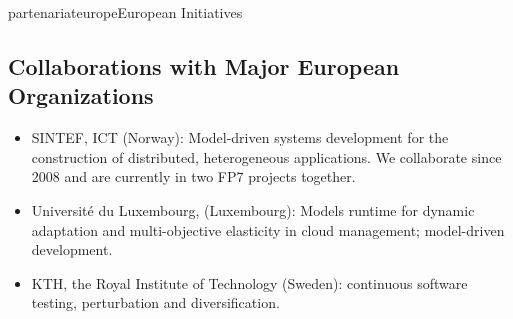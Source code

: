 \documentclass{ra2018}
\begin{document}
\begin{module}{partenariat}{europe}{European Initiatives}
\subsection{Collaborations with Major European Organizations}


\begin{itemize}
\item SINTEF, ICT (Norway): Model-driven systems development for the construction of distributed, heterogeneous applications. We collaborate since 2008 and are currently in two FP7 projects together.
\item Université du Luxembourg, (Luxembourg): Models runtime for dynamic adaptation and multi-objective elasticity in cloud management; model-driven development.
\item KTH, the Royal Institute of Technology (Sweden): continuous software testing, perturbation and diversification.
\end{itemize}


\end{module}


    
\end{document}
